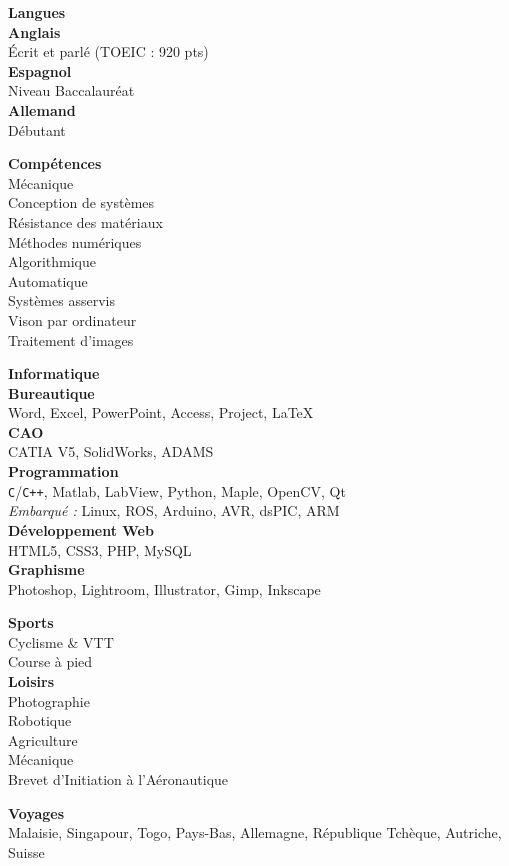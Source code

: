 \documentclass[a4paper,11pt,final]{memoir}
\newcommand{\SmallSep}{\vspace{0.5em}}
\newcommand{\SkillSection}[1]
	{\normalsize{\textbf{#1\\}}\normalfont\small}%
\newcommand{\SkillItem}[1]
	{\textbf{\color{RoyalBlue} #1}\normalfont\\}
\begin{document}
\begin{flushleft}
\SkillSection{Langues}
\SkillItem{Anglais}
Écrit et parlé (TOEIC : 920 pts)\\
\SkillItem{Espagnol}
Niveau Baccalauréat\\
\SkillItem{Allemand}
Débutant
\SmallSep

\SkillSection{Compétences}
Mécanique\\
Conception de systèmes\\
Résistance des matériaux\\
Méthodes numériques\\
Algorithmique\\
Automatique\\
Systèmes asservis\\
Vison par ordinateur\\
Traitement d'images
\SmallSep

\SkillSection{Informatique}
\SkillItem{Bureautique}
Word, Excel, PowerPoint, Access, Project, \LaTeX\\
\SkillItem{CAO}
CATIA V5, SolidWorks, ADAMS\\
\SkillItem{Programmation}
\verb!C!/\verb!C++!, Matlab, LabView, Python, Maple, OpenCV, Qt\\
\emph{Embarqué :} Linux, ROS, Arduino, AVR, dsPIC, ARM\\%
\SkillItem{Développement Web}
HTML5, CSS3, PHP, MySQL\\
\SkillItem{Graphisme}
Photoshop, Lightroom, Illustrator, Gimp, Inkscape\\
\SmallSep

\SkillSection{Sports}
Cyclisme \& VTT\\
Course à pied\\

\SkillSection{Loisirs}
Photographie\\
Robotique\\
Agriculture\\
Mécanique\\
Brevet d'Initiation à l'Aéronautique

\SkillSection{Voyages}
Malaisie, Singapour, Togo, Pays-Bas, Allemagne, République Tchèque, Autriche, Suisse
\end{flushleft}
\framebreak
\end{document}
